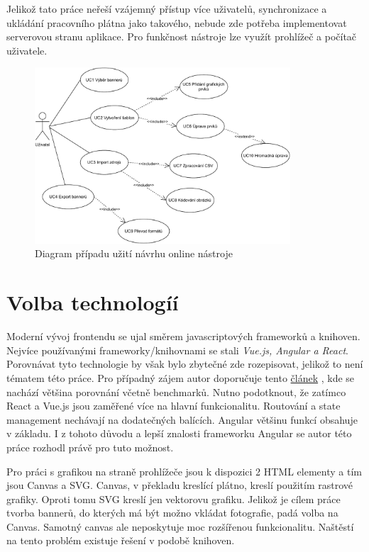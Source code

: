    Jelikož tato práce neřeší vzájemný přístup více uživatelů, synchronizace a ukládání pracovního plátna jako takového,
    nebude zde potřeba implementovat serverovou stranu aplikace. Pro funkčnost nástroje lze využít prohlížeč a počítač uživatele.

    \begin{figure}
        \centering
        \includegraphics[width=0.85\textwidth]{Figures/use-case.pdf}
        \caption[Diagram případu užití]{Diagram případu užití návrhu online nástroje}
        \label{fig:use-case-diagram}
    \end{figure}

    \section{Volba technologíí}
    Moderní vývoj frontendu se ujal směrem javascriptových frameworků a knihoven. Nejvíce používanými frameworky/knihovnami se stali \emph{Vue.js, Angular a React}.
    Porovnávat tyto technologie by však bylo zbytečné zde rozepisovat, jelikož to není tématem této práce.
    Pro případný zájem autor doporučuje tento \href{https://vuejs.org/v2/guide/comparison.html}{článek} \cite{js:framework-comparion}, kde se nachází většina porovnání včetně benchmarků.
    Nutno podotknout, že zatímco React a Vue.js jsou zaměřené více na hlavní funkcionalitu. Routování a state management nechávají
    na dodatečných balících. Angular většinu funkcí obsahuje v základu.
    I z tohoto důvodu a lepší znalosti frameworku Angular se autor této práce rozhodl právě pro tuto možnost. 

    Pro práci s grafikou na straně prohlížeče jsou k dispozici 2 HTML elementy a tím jsou Canvas a SVG.
    Canvas, v překladu kreslící plátno, kreslí použitím rastrové grafiky. Oproti tomu SVG kreslí jen vektorovu grafiku.
    Jelikož je cílem práce tvorba bannerů, do kterých má být možno vkládat fotografie, padá volba na Canvas.
    Samotný canvas ale neposkytuje moc rozšířenou funkcionalitu. Naštěstí na tento problém existuje řešení v podobě knihoven.

